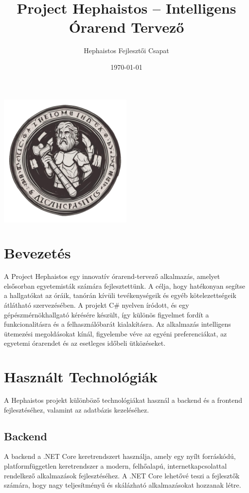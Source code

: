 \documentclass{article}
\title{Project Hephaistos -- Intelligens Órarend Tervező}
\author{Hephaistos Fejlesztői Csapat}
\date{\today}
\begin{document}
\maketitle
\begin{center}
    \includegraphics[width=0.5\textwidth]{logo.png}
\end{center}

\newpage

\tableofcontents

\newpage

\section*{Bevezetés}
A Project Hephaistos egy innovatív órarend-tervező alkalmazás, amelyet elsősorban egyetemisták számára fejlesztettünk. A célja, hogy hatékonyan segítse a hallgatókat az óráik, tanórán kívüli tevékenységeik és egyéb kötelezettségeik átlátható szervezésében. A projekt C\# nyelven íródott, és egy gépészmérnökhallgató kérésére készült, így különös figyelmet fordít a funkcionalitásra és a felhasználóbarát kialakításra. Az alkalmazás intelligens ütemezési megoldásokat kínál, figyelembe véve az egyéni preferenciákat, az egyetemi órarendet és az esetleges időbeli ütközéseket.

\section{Használt Technológiák}
A Hephaistos projekt különböző technológiákat használ a backend és a frontend fejlesztéséhez, valamint az adatbázis kezeléséhez.

\subsection{Backend}
A backend a .NET Core keretrendszert használja, amely egy nyílt forráskódú, platformfüggetlen keretrendszer a modern, felhőalapú, internetkapcsolattal rendelkező alkalmazások fejlesztéséhez. A .NET Core lehetővé teszi a fejlesztők számára, hogy nagy teljesítményű és skálázható alkalmazásokat hozzanak létre.
\end{document}
